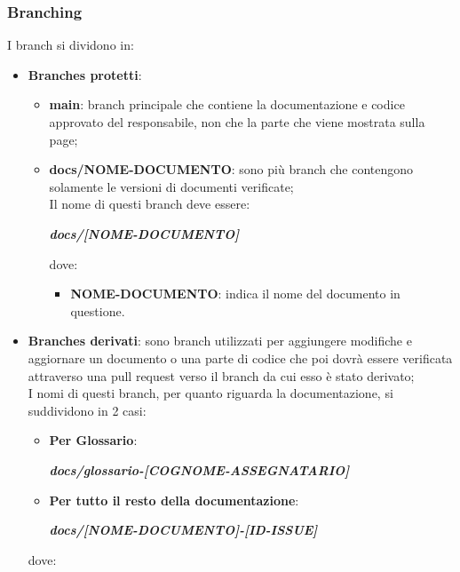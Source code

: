         \subsubsection{Branching}\label{inf:branch}
        I branch si dividono in:
        \begin{itemize}
            \item \textbf{Branches protetti}: 
            \begin{itemize}
                \item \textbf{main}: branch principale che contiene la documentazione e codice approvato del responsabile, non che la parte che viene mostrata sulla page;
                \item \textbf{docs/NOME-DOCUMENTO}: sono più branch che contengono solamente le versioni di documenti verificate;\\
                Il nome di questi branch deve essere:
                \begin{center}
                    \textbf{\textit{docs/[NOME-DOCUMENTO]}}
                \end{center}
                dove:
                \begin{itemize}
                    \item \textbf{NOME-DOCUMENTO}: indica il nome del documento in questione.
                \end{itemize}
            \end{itemize}
            \item \textbf{Branches derivati}: sono branch utilizzati per aggiungere modifiche e aggiornare un documento o una parte di codice che poi dovrà essere verificata
            attraverso una pull request verso il branch da cui esso è stato derivato;\\
            I nomi di questi branch, per quanto riguarda la documentazione, si suddividono in 2 casi:
            \begin{itemize}
                \item \textbf{Per Glossario}:
                \begin{center}
                    \textbf{\textit{docs/glossario-[COGNOME-ASSEGNATARIO]}}
                \end{center}
                \item \textbf{Per tutto il resto della documentazione}:
                \begin{center}
                    \textbf{\textit{docs/[NOME-DOCUMENTO]-[ID-ISSUE]}}
                \end{center}
            \end{itemize}
            dove:
    

\end{itemize}
